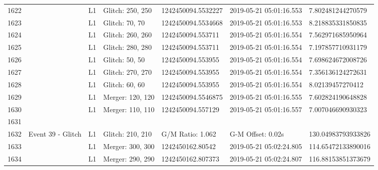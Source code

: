 \begin{longtable}{lllllll}
1622 &                                                    &       L1 &  Glitch: 250, 250 &  1242450094.5532227 &  2019-05-21 05:01:16.553 &   7.802481244270579 \\
1623 &                                                    &       L1 &    Glitch: 70, 70 &  1242450094.5534668 &  2019-05-21 05:01:16.553 &   8.218835331850835 \\
1624 &                                                    &       L1 &  Glitch: 260, 260 &   1242450094.553711 &  2019-05-21 05:01:16.554 &   7.562971685950964 \\
1625 &                                                    &       L1 &  Glitch: 280, 280 &   1242450094.553711 &  2019-05-21 05:01:16.554 &   7.197857710931179 \\
1626 &                                                    &       L1 &    Glitch: 50, 50 &   1242450094.553955 &  2019-05-21 05:01:16.554 &   7.698624672008726 \\
1627 &                                                    &       L1 &  Glitch: 270, 270 &   1242450094.553955 &  2019-05-21 05:01:16.554 &   7.356136124272631 \\
1628 &                                                    &       L1 &    Glitch: 60, 60 &   1242450094.553955 &  2019-05-21 05:01:16.554 &    8.02139457270412 \\
1629 &                                                    &       L1 &  Merger: 120, 120 &  1242450094.5546875 &  2019-05-21 05:01:16.555 &   7.602824190648828 \\
1630 &                                                    &       L1 &  Merger: 110, 110 &   1242450094.557129 &  2019-05-21 05:01:16.557 &   7.007046690930323 \\
1631 &                                                    &          &                   &                     &                          &                     \\
1632 &                                  Event 39 - Glitch &       L1 &  Glitch: 210, 210 &    G/M Ratio: 1.062 &        G-M Offset: 0.02s &  130.04983793933826 \\
1633 &                                                    &       L1 &  Merger: 300, 300 &    1242450162.80542 &  2019-05-21 05:02:24.805 &  114.65472133890016 \\
1634 &                                                    &       L1 &  Merger: 290, 290 &   1242450162.807373 &  2019-05-21 05:02:24.807 &  116.88153851373679 \\

\end{longtable}
